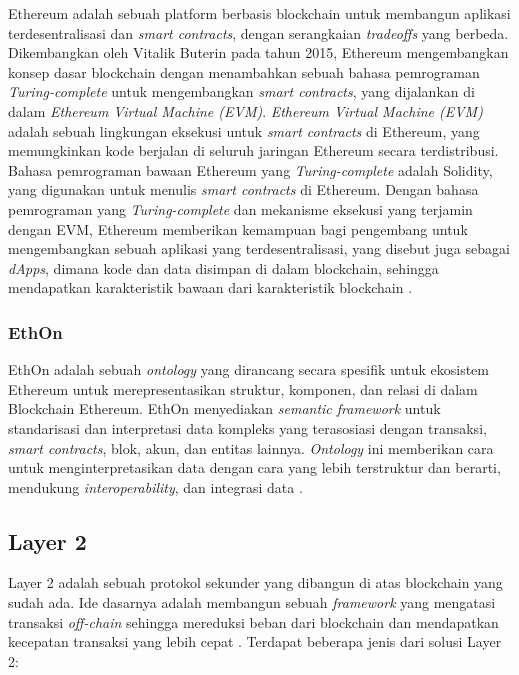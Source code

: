 Ethereum adalah sebuah platform berbasis blockchain untuk membangun aplikasi terdesentralisasi dan \textit{smart contracts}, dengan serangkaian \textit{tradeoffs} yang berbeda. Dikembangkan oleh Vitalik Buterin pada tahun 2015, Ethereum mengembangkan konsep dasar blockchain dengan menambahkan sebuah bahasa pemrograman \textit{Turing-complete} untuk mengembangkan \textit{smart contracts}, yang dijalankan di dalam \textit{Ethereum Virtual Machine (EVM)}. \textit{Ethereum Virtual Machine (EVM)} adalah sebuah lingkungan eksekusi untuk \textit{smart contracts} di Ethereum, yang memungkinkan kode berjalan di seluruh jaringan Ethereum secara terdistribusi. Bahasa pemrograman bawaan Ethereum yang \textit{Turing-complete} adalah Solidity, yang digunakan untuk menulis \textit{smart contracts} di Ethereum.  Dengan bahasa pemrograman yang \textit{Turing-complete} dan mekanisme eksekusi yang terjamin dengan EVM, Ethereum memberikan kemampuan bagi pengembang untuk mengembangkan sebuah aplikasi yang terdesentralisasi, yang disebut juga sebagai \textit{dApps}, dimana kode dan data disimpan di dalam blockchain, sehingga mendapatkan karakteristik bawaan dari karakteristik blockchain \parencite{buterin2013ethereum}.

\subsubsection{EthOn}
\label{subsubsec:ethon}

EthOn adalah sebuah \textit{ontology} yang dirancang secara spesifik untuk ekosistem Ethereum untuk merepresentasikan struktur, komponen, dan relasi di dalam Blockchain Ethereum. EthOn menyediakan \textit{semantic framework} untuk standarisasi dan interpretasi data kompleks yang terasosiasi dengan transaksi, \textit{smart contracts}, blok, akun, dan entitas lainnya. \textit{Ontology} ini memberikan cara untuk menginterpretasikan data dengan cara yang lebih terstruktur dan berarti, mendukung \textit{interoperability}, dan integrasi data \parencite{pfeffer2016ethon}.

\subsection{Layer 2}
\label{subsec:layer-2}

Layer 2 adalah sebuah protokol sekunder yang dibangun di atas blockchain yang sudah ada. Ide dasarnya adalah membangun sebuah \textit{framework} yang mengatasi transaksi \textit{off-chain} sehingga mereduksi beban dari blockchain dan mendapatkan kecepatan transaksi yang lebih cepat \parencite{sguanci2021layer}. Terdapat beberapa jenis dari solusi Layer 2:

